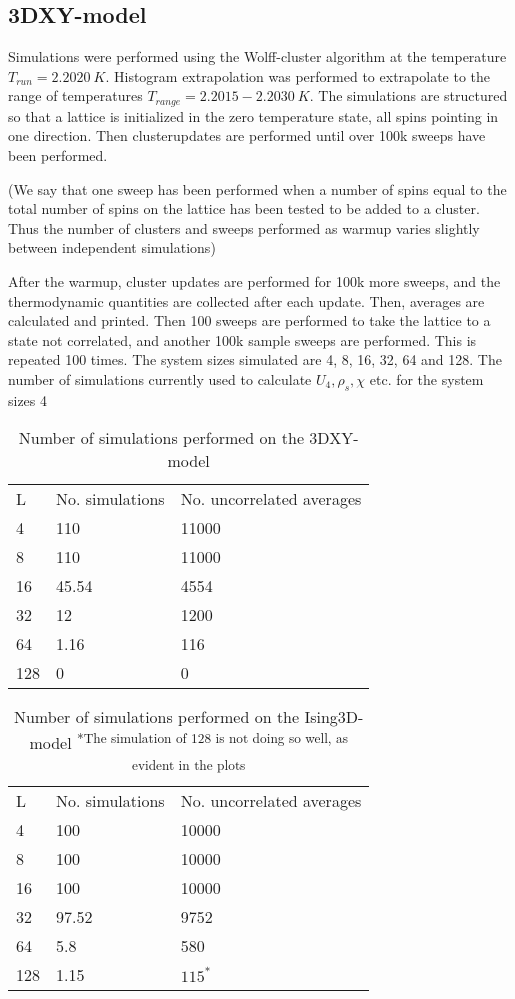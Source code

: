 \documentclass[a4paper]{article}
\begin{document}
\subsection{3DXY-model}
Simulations were performed using the Wolff-cluster algorithm at the temperature $T_{run} = 2.2020~K$. Histogram extrapolation was performed to extrapolate to the range of temperatures $T_{range} = 2.2015-2.2030 ~ K$.
The simulations are structured so that a lattice is initialized in the zero temperature state, all spins pointing in one direction. Then clusterupdates are performed until over 100k sweeps have been performed.

(We say that one sweep has been performed when a number of spins equal to the total number of spins on the lattice has been tested to be added to a cluster.
Thus the number of clusters and sweeps performed as warmup varies slightly between independent simulations)

After the warmup, cluster updates are performed for 100k more sweeps, and the thermodynamic quantities are collected after each update. Then, averages are calculated and printed. Then 100 sweeps are performed to take the lattice to a state not correlated, and another 100k sample sweeps are performed. This is repeated 100 times. The system sizes simulated are 4, 8, 16, 32, 64 and 128. 
The number of simulations currently used to calculate $U_4, \rho_s, \chi $ etc. for the system sizes 4

\begin{table}[htpb]
\begin{center}
\begin{tabular}{l l l}
  L & No. simulations & No. uncorrelated averages\\
  4 & 110 & 11000\\
  8 & 110 & 11000\\
  16 & 45.54 & 4554\\
  32 & 12 & 1200\\
  64 & 1.16 & 116 \\
  128 & 0  & 0 \\
\end{tabular}
\end{center}
\caption{Number of simulations performed on the 3DXY-model}
\end{table}

\begin{table}[htpb]
\begin{center}
\begin{tabular}{l l l}
  L & No. simulations & No. uncorrelated averages\\
  4 & 100 & 10000\\
  8 & 100 & 10000\\
  16 & 100 & 10000\\
  32 & 97.52 & 9752 \\
  64 & 5.8 & 580 \\
  128 & 1.15  & $115^{*}$ \\
\end{tabular}
\end{center}
\caption{Number of simulations performed on the Ising3D-model  \textsuperscript{*The simulation of 128 is not doing so well, as evident in the plots}}
\end{table}
\end{document}
